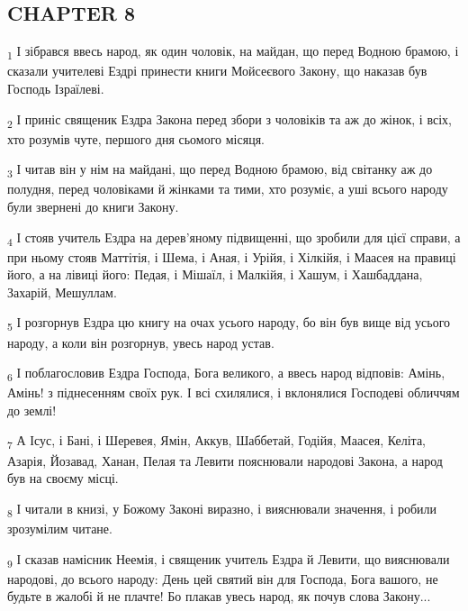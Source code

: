 \subsection{CHAPTER 8}
\begin{tcolorbox}
\textsubscript{1} І зібрався ввесь народ, як один чоловік, на майдан, що перед Водною брамою, і сказали учителеві Ездрі принести книги Мойсеєвого Закону, що наказав був Господь Ізраїлеві.
\end{tcolorbox}
\begin{tcolorbox}
\textsubscript{2} І приніс священик Ездра Закона перед збори з чоловіків та аж до жінок, і всіх, хто розумів чуте, першого дня сьомого місяця.
\end{tcolorbox}
\begin{tcolorbox}
\textsubscript{3} І читав він у нім на майдані, що перед Водною брамою, від світанку аж до полудня, перед чоловіками й жінками та тими, хто розуміє, а уші всього народу були звернені до книги Закону.
\end{tcolorbox}
\begin{tcolorbox}
\textsubscript{4} І стояв учитель Ездра на дерев'яному підвищенні, що зробили для цієї справи, а при ньому стояв Маттітія, і Шема, і Аная, і Урійя, і Хілкійя, і Маасея на правиці його, а на лівиці його: Педая, і Мішаїл, і Малкійя, і Хашум, і Хашбаддана, Захарій, Мешуллам.
\end{tcolorbox}
\begin{tcolorbox}
\textsubscript{5} І розгорнув Ездра цю книгу на очах усього народу, бо він був вище від усього народу, а коли він розгорнув, увесь народ устав.
\end{tcolorbox}
\begin{tcolorbox}
\textsubscript{6} І поблагословив Ездра Господа, Бога великого, а ввесь народ відповів: Амінь, Амінь! з піднесенням своїх рук. І всі схилялися, і вклонялися Господеві обличчям до землі!
\end{tcolorbox}
\begin{tcolorbox}
\textsubscript{7} А Ісус, і Бані, і Шеревея, Ямін, Аккув, Шаббетай, Годійя, Маасея, Келіта, Азарія, Йозавад, Ханан, Пелая та Левити пояснювали народові Закона, а народ був на своєму місці.
\end{tcolorbox}
\begin{tcolorbox}
\textsubscript{8} І читали в книзі, у Божому Законі виразно, і вияснювали значення, і робили зрозумілим читане.
\end{tcolorbox}
\begin{tcolorbox}
\textsubscript{9} І сказав намісник Неемія, і священик учитель Ездра й Левити, що вияснювали народові, до всього народу: День цей святий він для Господа, Бога вашого, не будьте в жалобі й не плачте! Бо плакав увесь народ, як почув слова Закону...
\end{tcolorbox}
